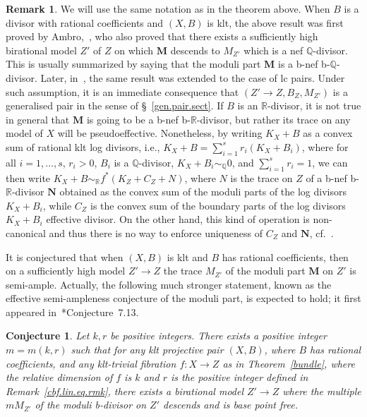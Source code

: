 \documentclass[11pt]{ip-journal}
\newtheorem{conjecture}[theorem]{Conjecture}
\theoremstyle{definition}
\newtheorem{remark}[theorem]{Remark}
\begin{document}
\begin{remark}
\label{cbf.rmk}
We will use the same notation as in the theorem above.
When 
$B$ 
is a divisor with rational coefficients and 
$(X, B)$ 
is klt, the above result was first proved by Ambro,~\cite{MR2134273}, who also proved that there exists a sufficiently high birational model 
$Z'$ 
of 
$Z$ 
on which 
$\mathbf{M}$ 
descends to 
$M_{Z'}$ 
which is a nef 
$\mathbb{Q}$-divisor.
This is usually summarized by saying that the moduli part 
$\mathbf M$ 
is a b-nef 
b-$\mathbb Q$-divisor.
Later, in~\cite{MR3329677}, the same result was extended to the case of lc pairs.
\newline
Under such assumption, it is an immediate consequence that 
$(Z' \to Z, B_Z, M_{Z'})$ 
is a generalised pair in the sense of \S~\ref{gen.pair.sect}.
\newline
If 
$B$ 
is an 
$\mathbb{R}$-divisor, 
it is not true in general that 
$\mathbf{M}$ 
is going to be a b-nef 
b-$\mathbb R$-divisor, 
but rather its trace on any model of 
$X$ 
will be pseudoeffective.
\newline
Nonetheless, by writing 
$K_X+B$ 
as a convex sum of rational klt log divisors, i.e., 
$K_X+B=\sum_{i=1}^s r_i(K_{X}+B_i)$, 
where for all 
$i=1, \dots, s$,
$r_i > 0$, 
$B_i$
is a 
$\mathbb{Q}$-divisor,
$K_X+B_i\sim_\mathbb{Q}0$, 
and 
$\sum_{i=1}^s r_i=1$,
we can then write 
$K_X+B \sim_\mathbb{R} f^\ast (K_Z+C_Z+N)$, 
where 
$N$ 
is the trace on 
$Z$ 
of a b-nef 
b-$\mathbb R$-divisor 
$\mathbf N$ 
obtained as the convex sum of the moduli parts of the log divisors 
$K_X+B_i$, 
while 
$C_Z$ 
is the convex sum of the boundary parts of the log divisors 
$K_X+B_i$ 
effective divisor.
On the other hand, this kind of operation is non-canonical and thus there is no way to enforce uniqueness of 
$C_Z$ 
and 
$\mathbf N$, 
cf.~\cite{MR4398255}.
\end{remark}

It is conjectured that when 
$(X, B)$ 
is klt and $B$ 
has rational coefficients, then on a sufficiently high model 
$Z' \to Z$ 
the trace 
$M_{Z'}$ 
of the moduli part 
$\mathbf M$ 
on 
$Z'$
is semi-ample.
Actually, the following much stronger statement, known as the effective semi-ampleness conjecture of the moduli part, is expected to hold;
it first appeared in~\cite{MR2448282}*{Conjecture~7.13}.

\begin{conjecture}
\label{conj:eff.semi}
Let 
$k, r$ 
be positive integers.
There exists a positive integer 
$m=m(k,r)$ 
such that for any klt projective pair 
$(X, B)$, 
where 
$B$ 
has rational coefficients, and any klt-trivial fibration 
$f \colon X \rightarrow Z$ 
as in Theorem~\ref{bundle}, where the relative dimension of 
$f$ 
is 
$k$ 
and 
$r$ 
is the positive integer defined in Remark~\ref{cbf.lin.eq.rmk}, there exists a birational model 
$Z' \rightarrow Z$ 
where the multiple 
$mM_{Z'}$ 
of the moduli b-divisor on 
$Z'$ 
descends and is base point free.
\end{conjecture}
\end{document}
